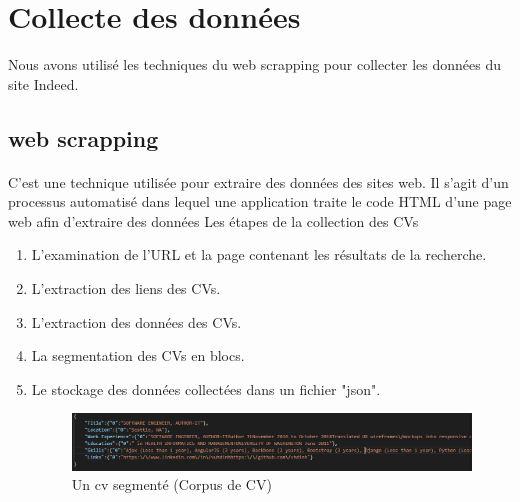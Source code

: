 \documentclass{article}
\begin{document}
\section{Collecte des données}
Nous avons utilisé les techniques du web scrapping pour collecter les données du site Indeed.
\subsection{web scrapping}
\paragraph{}C'est une technique utilisée pour extraire des données des sites web. Il s'agit d'un processus automatisé dans lequel une application traite le code HTML d'une page web afin d'extraire des
données
Les étapes de la collection des CVs
\begin{enumerate}
    \item L'examination de l'URL et la page contenant les résultats de la recherche.
    \item L'extraction des liens des CVs.
    \item L'extraction des données des CVs.
    \item La segmentation des CVs en blocs.
    \item Le stockage des données collectées dans un fichier "json".
    
    \begin{figure}[H]
  	\centering
    	  \includegraphics[width=1.0\textwidth]{Figures/cvseg.PNG}
  		\caption{Un cv segmenté (Corpus de CV)}
  	\label{json}
\end{figure}

\end{enumerate}
\end{document}
